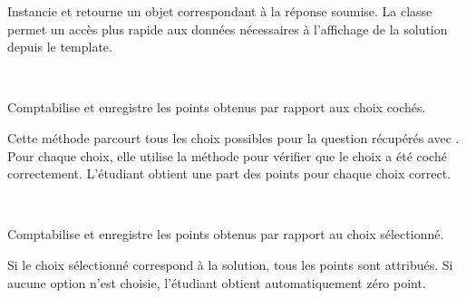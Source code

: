 \documentclass[a4,10pt,french]{sphinxmanual}
\begin{document}
\begin{fulllineitems}
\begin{fulllineitems}
\label{database:quiz.models.QcmSubmit.build_correct}
Instancie et retourne un objet  correspondant à la réponse soumise.
La classe  permet un accès plus rapide aux données nécessaires
à l'affichage de la solution depuis le template.

\end{fulllineitems}


\end{fulllineitems}


\begin{fulllineitems}
\label{database:quiz.models.QcmSubmitMulti}~

\begin{fulllineitems}
\label{database:quiz.models.QcmSubmitMulti.save_result}
Comptabilise et enregistre les points obtenus par rapport aux choix cochés.

Cette méthode parcourt tous les choix possibles pour la question
 récupérés avec . Pour chaque
choix, elle utilise la méthode  pour
vérifier que le choix a été coché correctement. L'étudiant obtient une part
des points pour chaque choix correct.

\end{fulllineitems}


\end{fulllineitems}


\begin{fulllineitems}
\label{database:quiz.models.QcmSubmitOne}~

\begin{fulllineitems}
\label{database:quiz.models.QcmSubmitOne.save_result}
Comptabilise et enregistre les points obtenus par rapport au choix sélectionné.

Si le choix sélectionné correspond à la solution, tous les points sont attribués.
Si aucune option n'est choisie, l'étudiant obtient automatiquement zéro point.

\end{fulllineitems}


\end{fulllineitems}
\end{document}
